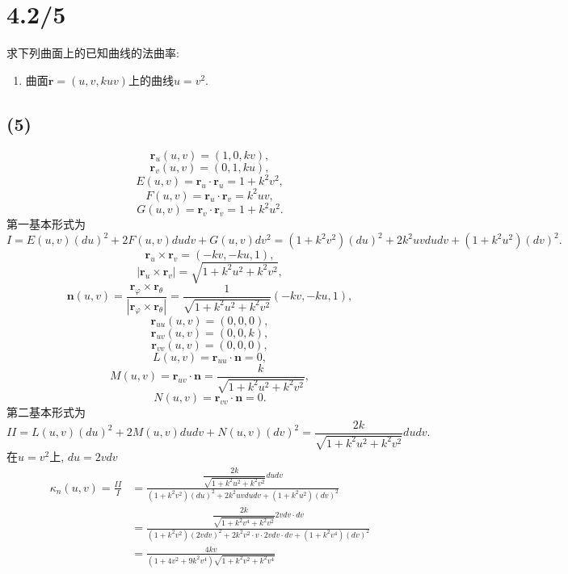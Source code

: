 \documentclass[11pt,a4paper]{article}
\begin{document}
\section{4.2/5}
\begin{problem}
  求下列曲面上的已知曲线的法曲率:
  \begin{enumerate}
    \addtocounter{enumi}{4}
    \item 曲面$\mathbf{r}=(u,v,kuv)$上的曲线$u=v^2$.
  \end{enumerate}
\end{problem}

\subsection*{(5)}
$$\mathbf{r}_u(u,v)=(1,0,kv),$$
$$\mathbf{r}_v(u,v)=(0,1,ku),$$
$$E(u,v)=\mathbf{r}_u\cdot \mathbf{r}_u=1+k^2v^2,$$
$$F(u,v)=\mathbf{r}_u\cdot \mathbf{r}_v=k^2uv,$$
$$G(u,v)=\mathbf{r}_v\cdot \mathbf{r}_v=1+k^2u^2.$$
第一基本形式为
$$I=E(u,v)(du)^2+2F(u,v)dudv+G(u,v)dv^2=(1+k^2v^2)(du)^2+2k^2uvdudv+(1+k^2u^2)(dv)^2.$$
$$\mathbf{r}_u\times\mathbf{r}_v=(-kv,-ku,1),$$
$$|\mathbf{r}_u\times\mathbf{r}_v|=\sqrt{1+k^2u^2+k^2v^2},$$
$$\mathbf{n}(u,v)=\frac{\mathbf{r}_\varphi\times\mathbf{r}_\theta}{|\mathbf{r}_\varphi\times\mathbf{r}_\theta|}=\frac{1}{\sqrt{1+k^2u^2+k^2v^2}}(-kv,-ku,1),$$
$$\mathbf{r}_{uu}(u,v)=(0,0,0),$$
$$\mathbf{r}_{uv}(u,v)=(0,0,k),$$
$$\mathbf{r}_{vv}(u,v)=(0,0,0),$$
$$L(u,v)=\mathbf{r}_{uu}\cdot\mathbf{n}=0,$$
$$M(u,v)=\mathbf{r}_{uv}\cdot\mathbf{n}=\frac{k}{\sqrt{1+k^2u^2+k^2v^2}},$$
$$N(u,v)=\mathbf{r}_{vv}\cdot\mathbf{n}=0.$$
第二基本形式为
$$II=L(u,v)(du)^2+2M(u,v)dudv+N(u,v)(dv)^2=\frac{2k}{\sqrt{1+k^2u^2+k^2v^2}}dudv.$$
在$u=v^2$上, $du=2vdv$
\begin{align*}
\kappa_n(u,v)=\frac{II}{I}
&=\frac{\dfrac{2k}{\sqrt{1+k^2u^2+k^2v^2}}dudv}{(1+k^2v^2)(du)^2+2k^2uvdudv+(1+k^2u^2)(dv)^2}\\
&=\frac{\dfrac{2k}{\sqrt{1+k^2v^4+k^2v^2}}2vdv\cdot dv}{(1+k^2v^2)(2vdv)^2+2k^2v^2\cdot v\cdot 2vdv\cdot dv+(1+k^2v^4)(dv)^2}\\
&=\frac{4 k v}{\left(1+4v^2+9 k^2 v^4\right) \sqrt{1+k^2v^2+k^2v^4}}
\end{align*}
\end{document}
